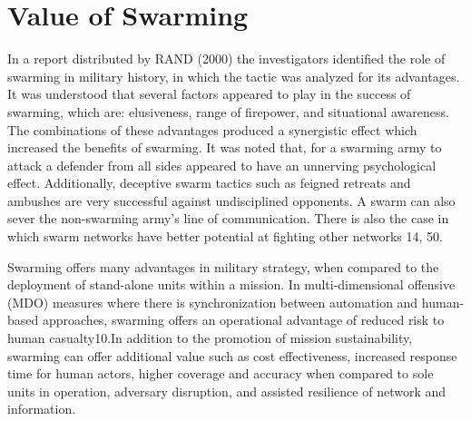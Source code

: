\section*{Value of Swarming}
In a report distributed by RAND (2000) the investigators identified the role of swarming in military history, in which the tactic was analyzed for its advantages. It was understood that several factors appeared to play in the success of swarming, which are: elusiveness, range of firepower, and situational awareness. The combinations of these advantages produced a synergistic effect which increased the benefits of swarming. It was noted that, for a swarming army to attack a defender from all sides appeared to have an unnerving psychological effect. Additionally, deceptive swarm tactics such as feigned retreats and ambushes are very successful against undisciplined opponents. A swarm can also sever the non-swarming army’s line of communication. There is also the case in which swarm networks have better potential at fighting other networks 14, 50. 

Swarming offers many advantages in military strategy, when compared to the deployment of stand-alone units within a mission. In multi-dimensional offensive (MDO) measures where there is synchronization between automation and human-based approaches, swarming offers an operational advantage of reduced risk to human casualty10.In addition to the promotion of mission sustainability, swarming can offer additional value such as cost effectiveness, increased response time for human actors, higher coverage and accuracy when compared to sole units in operation, adversary disruption, and assisted resilience of network and information.
